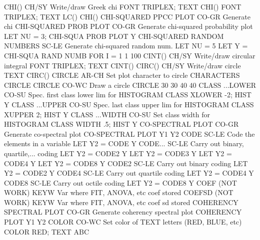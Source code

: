 CHI()                       CH/SY Write/draw Greek chi
                                  FONT TRIPLEX; TEXT CHI()
                                  FONT TRIPLEX; TEXT LC() CHI()
                                  CHI-SQUARED PPCC PLOT       CO-GR Generate chi
CHI-SQUARED PROB PLOT       CO-GR Generate chi-squared probability plot
                                  LET NU = 3; CHI-SQUA PROB PLOT Y
CHI-SQUARED RANDOM NUMBERS  SC-LE Generate chi-squared random num.
                                  LET NU = 5
                                  LET Y = CHI-SQUA RAND NUMB FOR I = 1 1 100
CINT()                      CH/SY Write/draw circular integral
                                  FONT TRIPLEX; TEXT CINT()
CIRC()                      CH/SY Write/draw circle
                                  TEXT CIRC()
CIRCLE                      AR-CH Set plot character to circle
                                  CHARACTERS CIRCLE
CIRCLE                      CO-WC Draw a circle
                                  CIRCLE 30 30 40 40
CLASS ...LOWER              CO-SU Spec. first class lower lim for HISTOGRAM
                                  CLASS XLOWER -2; HIST Y
CLASS ...UPPER              CO-SU Spec. last class upper lim for HISTOGRAM
                                  CLASS XUPPER 2; HIST Y
CLASS ...WIDTH              CO-SU Set class width for HISTOGRAM
                                  CLASS WIDTH .5; HIST Y
CO-SPECTRAL PLOT            CO-GR Generate co-spectral plot
                                  CO-SPECTRAL PLOT Y1 Y2
CODE                        SC-LE Code the elements in a variable
                                  LET Y2 = CODE Y
CODE...                     SC-LE Carry out binary, quartile,... coding
                                  LET Y2 = CODE2 Y
                                  LET Y2 = CODE3 Y
                                  LET Y2 = CODE4 Y
                                  LET Y2 = CODE8 Y
CODE2                       SC-LE Carry out binary coding
                                  LET Y2 = CODE2 Y
CODE4                       SC-LE Carry out quartile coding
                                  LET Y2 = CODE4 Y
CODE8                       SC-LE Carry out octile coding
                                  LET Y2 = CODE8 Y
COEF (NOT WORK)            KEYW  Var where FIT, ANOVA, etc coef stored
COEFSD (NOT WORK)           KEYW  Var where FIT, ANOVA, etc coef sd stored
COHERENCY SPECTRAL PLOT     CO-GR Generate coherency spectral plot
                                  COHERENCY PLOT Y1 Y2
COLOR                       CO-WC Set color of TEXT letters (RED, BLUE, etc)
                                  COLOR RED; TEXT ABC
